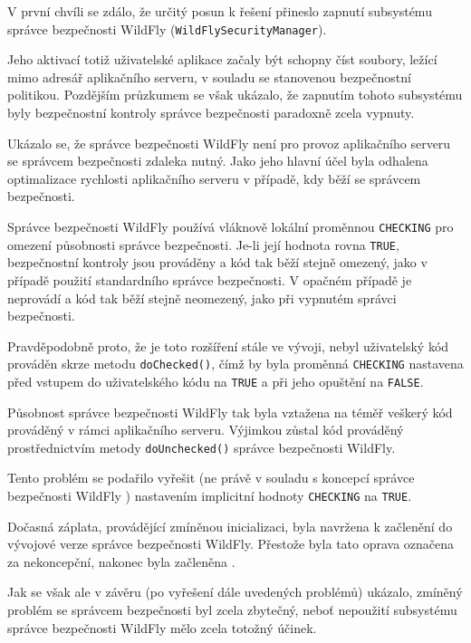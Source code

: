 V první chvíli se zdálo, že určitý posun k řešení přineslo zapnutí subsystému správce bezpečnosti WildFly ({\tt WildFlySecurityManager}).

Jeho aktivací totiž uživatelské aplikace začaly být schopny číst soubory, ležící mimo adresář aplikačního serveru, v souladu se stanovenou bezpečnostní politikou.
Pozdějším průzkumem se však ukázalo, že zapnutím tohoto subsystému byly bezpečnostní kontroly správce bezpečnosti paradoxně zcela vypnuty.

Ukázalo se, že správce bezpečnosti WildFly není pro provoz aplikačního serveru se správcem bezpečnosti zdaleka nutný.
Jako jeho hlavní účel byla odhalena optimalizace rychlosti aplikačního serveru v případě, kdy běží se správcem bezpečnosti.

Správce bezpečnosti WildFly používá vláknově lokální proměnnou {\tt CHECKING} pro omezení působnosti správce bezpečnosti.
Je-li její hodnota rovna {\tt TRUE}, bezpečnostní kontroly jsou prováděny a kód tak běží stejně omezený, jako v případě použití standardního správce bezpečnosti.
V opačném případě je neprovádí a kód tak běží stejně neomezený, jako při vypnutém správci bezpečnosti. \cite{sourceWildFlySecurityManager}

Pravděpodobně proto, že je toto rozšíření stále ve vývoji, nebyl uživatelský kód prováděn skrze metodu {\tt doChecked()}, čímž by byla proměnná
{\tt CHECKING} nastavena před vstupem do uživatelského kódu na {\tt TRUE} a při jeho opuštění na {\tt FALSE}. \cite{sourceWildFlySecurityManager}

Působnost správce bezpečnosti WildFly tak byla vztažena na téměř veškerý kód prováděný v rámci aplikačního serveru. Výjimkou zůstal kód prováděný prostřednictvím metody {\tt doUnchecked()} správce bezpečnosti WildFly.

Tento problém se podařilo vyřešit (ne právě v souladu s koncepcí správce bezpečnosti WildFly \cite{smPullRequest}) nastavením implicitní hodnoty {\tt CHECKING}
na {\tt TRUE}.

Dočasná záplata, provádějící zmíněnou inicializaci, byla navržena k začlenění do vývojové verze správce bezpečnosti WildFly. \cite{smPullRequest}
Přestože byla tato oprava označena za nekoncepční, nakonec byla začleněna \cite{smPullRequestImpl}.

Jak se však ale v závěru (po vyřešení dále uvedených problémů) ukázalo, zmíněný problém se správcem bezpečnosti byl zcela zbytečný, neboť nepoužití subsystému správce bezpečnosti WildFly mělo zcela totožný účinek.

